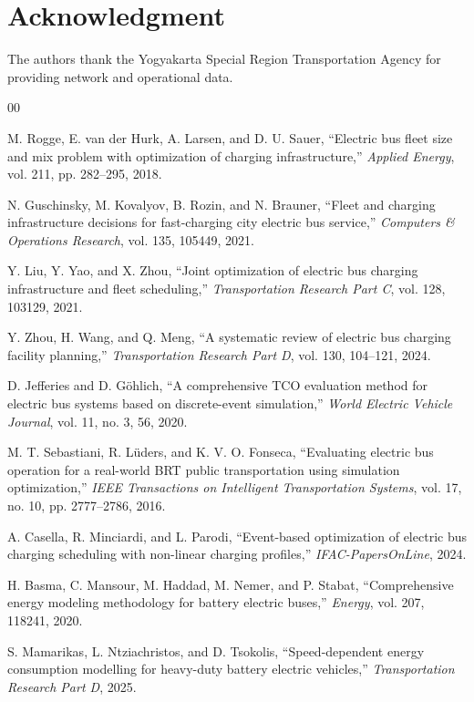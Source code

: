 \documentclass[conference]{IEEEtran}
\begin{document}
\section*{Acknowledgment}

The authors thank the Yogyakarta Special Region Transportation Agency for
providing network and operational data.

\begin{thebibliography}{00}

 M. Rogge, E. van der Hurk, A. Larsen, and D. U. Sauer,
``Electric bus fleet size and mix problem with optimization of charging
infrastructure,'' \emph{Applied Energy}, vol. 211, pp. 282--295, 2018.

 N. Guschinsky, M. Kovalyov, B. Rozin, and
N. Brauner, ``Fleet and charging infrastructure decisions for fast-charging
city electric bus service,'' \emph{Computers \& Operations Research},
vol. 135, 105449, 2021.

 Y. Liu, Y. Yao, and X. Zhou, ``Joint optimization of
electric bus charging infrastructure and fleet scheduling,''
\emph{Transportation Research Part C}, vol. 128, 103129, 2021.

 Y. Zhou, H. Wang, and Q. Meng, ``A systematic review of
electric bus charging facility planning,'' \emph{Transportation Research
Part D}, vol. 130, 104--121, 2024.

 D. Jefferies and D. Göhlich, ``A
comprehensive TCO evaluation method for electric bus systems based on
discrete-event simulation,'' \emph{World Electric Vehicle Journal},
vol. 11, no. 3, 56, 2020.

 M. T. Sebastiani, R. Lüders, and K. V. O.
Fonseca, ``Evaluating electric bus operation for a real-world BRT public
transportation using simulation optimization,'' \emph{IEEE Transactions on
Intelligent Transportation Systems}, vol. 17, no. 10, pp. 2777--2786,
2016.

 A. Casella, R. Minciardi, and L. Parodi,
``Event-based optimization of electric bus charging scheduling with
non-linear charging profiles,'' \emph{IFAC-PapersOnLine}, 2024.

 H. Basma, C. Mansour, M. Haddad, M. Nemer, and
P. Stabat, ``Comprehensive energy modeling methodology for battery
electric buses,'' \emph{Energy}, vol. 207, 118241, 2020.

 S. Mamarikas, L. Ntziachristos, and
D. Tsokolis, ``Speed-dependent energy consumption modelling for
heavy-duty battery electric vehicles,'' \emph{Transportation Research
Part D}, 2025.


\end{thebibliography}
\end{document}

